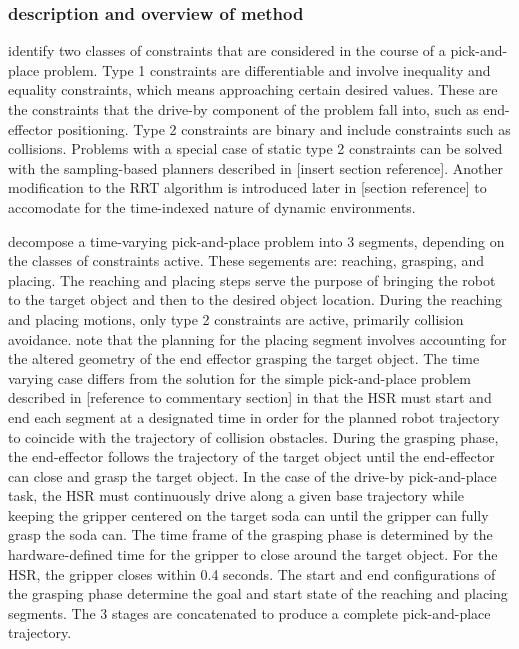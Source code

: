 \documentclass[12pt]{article}
\begin{document}
        \subsubsection{description and overview of method}
            \cite{yang_planning_2018} identify two classes of constraints that are considered in the course of a pick-and-place problem. Type 1 constraints are differentiable and involve inequality and equality constraints, which means approaching certain desired values. These are the constraints that the drive-by component of the problem fall into, such as end-effector positioning. Type 2 constraints are binary and include constraints such as collisions. Problems with a special case of static type 2 constraints can be solved with the sampling-based planners described in [insert section reference]. Another modification to the RRT algorithm is introduced later in [section reference] to accomodate for the time-indexed nature of dynamic environments.

            \par \cite{yang_planning_2018} decompose a time-varying pick-and-place problem into 3 segments, depending on the classes of constraints active. These segements are: reaching, grasping, and placing. The reaching and placing steps serve the purpose of bringing the robot to the target object and then to the desired object location. During the reaching and placing motions, only type 2 constraints are active, primarily collision avoidance. \cite{yang_planning_2018} note that the planning for the placing segment involves accounting for the altered geometry of the end effector grasping the target object. The time varying case differs from the solution for the simple pick-and-place problem described in [reference to commentary section] in that the HSR must start and end each segment at a designated time in order for the planned robot trajectory to coincide with the trajectory of collision obstacles. During the grasping phase, the end-effector follows the trajectory of the target object until the end-effector can close and grasp the target object. In the case of the drive-by pick-and-place task, the HSR must continuously drive along a given base trajectory while keeping the gripper centered on the target soda can until the gripper can fully grasp the soda can. The time frame of the grasping phase is determined by the hardware-defined time for the gripper to close around the target object. For the HSR, the gripper closes within 0.4 seconds. The start and end configurations of the grasping phase determine the goal and start state of the reaching and placing segments. The 3 stages are concatenated to produce a complete pick-and-place trajectory.
\end{document}
